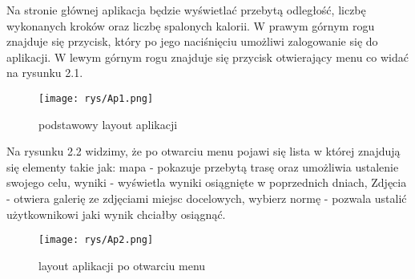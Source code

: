 \hspace{1cm}Na stronie głównej aplikacja będzie wyświetlać przebytą odległość, liczbę wykonanych kroków oraz liczbę spalonych kalorii. W prawym górnym rogu znajduje się przycisk, który po jego naciśnięciu umożliwi zalogowanie się do aplikacji. W lewym górnym rogu znajduje się przycisk otwierający menu co widać na rysunku 2.1.
	\begin{figure}[!htb]
		\begin{center}
				\texttt{[image: rys/Ap1.png]}
				\caption{podstawowy layout aplikacji}
				\label{rys:rysunek001}
			\end{center}
	\end{figure}
\newline
Na rysunku 2.2 widzimy, że po otwarciu menu pojawi się lista w której znajdują się elementy takie jak: mapa - pokazuje przebytą trasę oraz umożliwia ustalenie swojego celu, wyniki - wyświetla wyniki osiągnięte w poprzednich dniach, Zdjęcia - otwiera galerię ze zdjęciami miejsc docelowych, wybierz normę - pozwala ustalić użytkownikowi jaki wynik chciałby osiągnąć.
\newline
  \begin{figure}[!htb]
	\begin{center}
		\texttt{[image: rys/Ap2.png]}
		\caption{layout aplikacji po otwarciu menu}
		\label{rys:rysunek002}
	\end{center}
  \end{figure}






